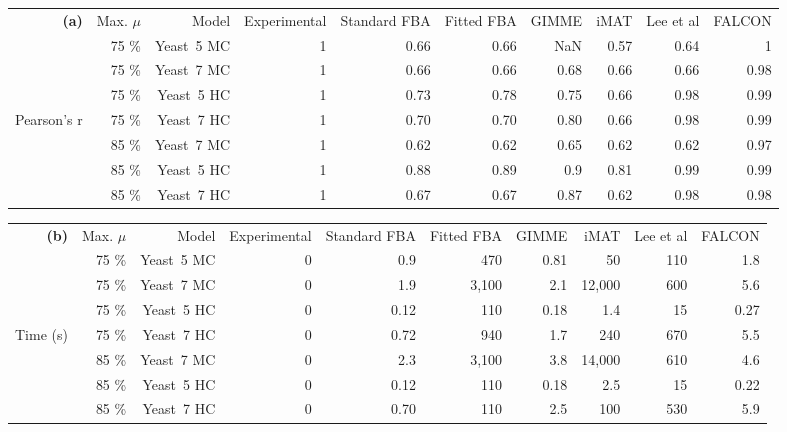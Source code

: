 \begin{table*}
\begin{center}
\small
\begin{tabular}{rrrrrrrrrr}
\textbf{(a)} \hspace{1.2cm} & Max. $\mu$ & Model & Experimental & 
  Standard FBA & Fitted FBA & GIMME & iMAT & Lee et al & FALCON\\
 & 75 \%& Yeast~5 MC & 1 & 0.66 & 0.66 & NaN  & 0.57 & 0.64 & 1 \\
 & 75 \%& Yeast~7 MC & 1 & 0.66 & 0.66 & 0.68 & 0.66 & 0.66 & 0.98\\
 & 75 \%& Yeast~5 HC & 1 & 0.73 & 0.78 & 0.75 & 0.66 & 0.98 & 0.99\\
Pearson's r  
 & 75 \%& Yeast~7 HC & 1 & 0.70 & 0.70 & 0.80 & 0.66 & 0.98 & 0.99\\
 & 85 \%& Yeast~7 MC & 1 & 0.62 & 0.62 & 0.65 & 0.62 & 0.62 & 0.97\\
 & 85 \%& Yeast~5 HC & 1 & 0.88 & 0.89 & 0.9  & 0.81 & 0.99 & 0.99\\
 & 85 \%& Yeast~7 HC & 1 & 0.67 & 0.67 & 0.87 & 0.62 & 0.98 & 0.98\\
\end{tabular}
\begin{tabular}{rrrrrrrrrr}
\textbf{(b)} \hspace{1.2cm} & Max. $\mu$ & Model & Experimental & 
  Standard FBA & Fitted FBA & GIMME & iMAT & Lee et al & FALCON\\
 & 75 \%& Yeast~5 MC & 0 & 0.9  & 470   & 0.81  & 50     & 110 & 1.8 \\
 & 75 \%& Yeast~7 MC & 0 & 1.9  & 3,100 & 2.1   & 12,000 & 600 & 5.6 \\
 & 75 \%& Yeast~5 HC & 0 & 0.12 & 110   & 0.18  & 1.4    & 15  & 0.27\\
Time (s) 
 & 75 \%& Yeast~7 HC & 0 & 0.72 & 940   & 1.7   & 240    & 670 & 5.5 \\
 & 85 \%& Yeast~7 MC & 0 & 2.3  & 3,100 & 3.8   & 14,000 & 610 & 4.6 \\
 & 85 \%& Yeast~5 HC & 0 & 0.12 & 110   & 0.18  & 2.5    & 15  & 0.22\\
 & 85 \%& Yeast~7 HC & 0 & 0.70 & 110   & 2.5   & 100    & 530 & 5.9\\
\end{tabular}
\end{center}
\caption{Performance of FALCON and other CBM methods for predicting
yeast exometabolic fluxes in two growth conditions with highly (HC)
and minimally (MC) constrained models \textbf{(a)} and associated
timing analysis \textbf{(b)}. For Lee et al. and FALCON methods, the
mean time for a single run of the method is listed; all other methods
did not have any stochasticity employed. Values are shown in two
significant figures. Method descriptions can be found in
\citealt{Lee2012}.}
\label{tab:FalcPerf}
\end{table*}

